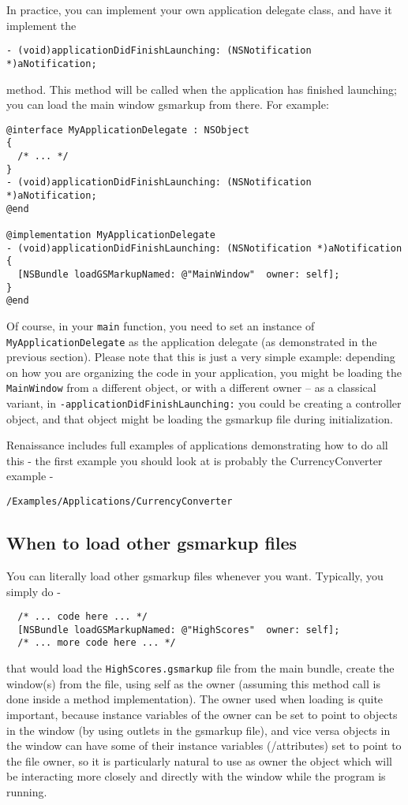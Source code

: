 In practice, you can implement your own application delegate class,
and have it implement the 
\begin{verbatim}
- (void)applicationDidFinishLaunching: (NSNotification *)aNotification;
\end{verbatim}
method.  This method will be called when the application has finished
launching; you can load the main window gsmarkup from there.  For
example:
\begin{verbatim}
@interface MyApplicationDelegate : NSObject
{
  /* ... */
}
- (void)applicationDidFinishLaunching: (NSNotification *)aNotification;
@end

@implementation MyApplicationDelegate
- (void)applicationDidFinishLaunching: (NSNotification *)aNotification
{
  [NSBundle loadGSMarkupNamed: @"MainWindow"  owner: self];  
}
@end
\end{verbatim}
Of course, in your \texttt{main} function, you need to set an instance
of \texttt{MyApplicationDelegate} as the application delegate (as
demonstrated in the previous section).  Please note that this is just
a very simple example: depending on how you are organizing the code in
your application, you might be loading the \texttt{MainWindow} from a
different object, or with a different owner -- as a classical variant,
in \texttt{-applicationDidFinishLaunching:} you could be creating a
controller object, and that object might be loading the gsmarkup file
during initialization.

Renaissance includes full examples of applications demonstrating how
to do all this - the first example you should look at is probably the
CurrencyConverter example -
\begin{verbatim}
/Examples/Applications/CurrencyConverter
\end{verbatim}

\subsection{When to load other gsmarkup files}
You can literally load other gsmarkup files whenever you want.
Typically, you simply do -
\begin{verbatim}
  /* ... code here ... */
  [NSBundle loadGSMarkupNamed: @"HighScores"  owner: self];  
  /* ... more code here ... */
\end{verbatim}
that would load the \texttt{HighScores.gsmarkup} file from the main
bundle, create the window(s) from the file, using self as the owner
(assuming this method call is done inside a method implementation).
The owner used when loading is quite important, because instance
variables of the owner can be set to point to objects in the window
(by using outlets in the gsmarkup file), and vice versa objects in the
window can have some of their instance variables (/attributes) set to
point to the file owner, so it is particularly natural to use as owner
the object which will be interacting more closely and directly with
the window while the program is running.

